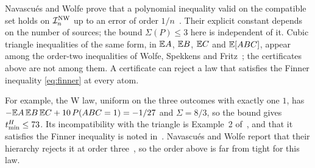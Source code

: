 \begin{remark}
Navascués and Wolfe prove that a polynomial inequality valid on the compatible set holds on $\mathcal I^{\mathrm{NW}}_n$ up to an error of order $1/n$~\cite[Theorem 1, eqs.~(34) and (A5)]{NW2020}. Their explicit constant depends on the number of sources; the bound $\Sigma(P)\le3$ here is independent of it. Cubic triangle inequalities of the same form, in $\mathbb E A$, $\mathbb E B$, $\mathbb E C$ and $\mathbb E[ABC]$, appear among the order-two inequalities of Wolfe, Spekkens and Fritz~\cite[Section IV C, eqs.~(51)--(54) of arXiv v5]{WSF2019}; the certificates above are not among them. A certificate can reject a law that satisfies the Finner inequality \eqref{eq:finner} at every atom.

For example, the W law, uniform on the three outcomes with exactly one $1$, has $-\mathbb E A\,\mathbb E B\,\mathbb E C+10\,P(ABC=1)=-1/27$ and $\Sigma=8/3$, so the bound gives $t_{\min}^H\le73$. Its incompatibility with the triangle is Example~2 of~\cite{WSF2019}, and that it satisfies the Finner inequality is noted in~\cite[footnote 4]{Renou2019}. Navascués and Wolfe report that their hierarchy rejects it at order three~\cite[footnote 2]{NW2020}, so the order above is far from tight for this law.
\end{remark}
